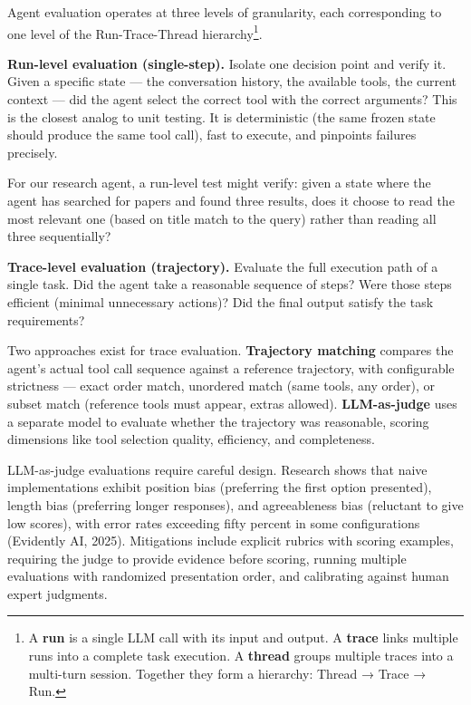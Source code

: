 \documentclass[11pt, a4paper]{article}
\begin{document}
Agent evaluation operates at three levels of granularity, each
corresponding to one level of the Run-Trace-Thread hierarchy\footnote{A
  \textbf{run} is a single LLM call with its input and output. A
  \textbf{trace} links multiple runs into a complete task execution. A
  \textbf{thread} groups multiple traces into a multi-turn session.
  Together they form a hierarchy: Thread → Trace → Run.}.

\textbf{Run-level evaluation (single-step).} Isolate one decision point
and verify it. Given a specific state --- the conversation history, the
available tools, the current context --- did the agent select the
correct tool with the correct arguments? This is the closest analog to
unit testing. It is deterministic (the same frozen state should produce
the same tool call), fast to execute, and pinpoints failures precisely.

For our research agent, a run-level test might verify: given a state
where the agent has searched for papers and found three results, does it
choose to read the most relevant one (based on title match to the query)
rather than reading all three sequentially?

\textbf{Trace-level evaluation (trajectory).} Evaluate the full
execution path of a single task. Did the agent take a reasonable
sequence of steps? Were those steps efficient (minimal unnecessary
actions)? Did the final output satisfy the task requirements?

Two approaches exist for trace evaluation. \textbf{Trajectory matching}
compares the agent's actual tool call sequence against a reference
trajectory, with configurable strictness --- exact order match,
unordered match (same tools, any order), or subset match (reference
tools must appear, extras allowed). \textbf{LLM-as-judge} uses a
separate model to evaluate whether the trajectory was reasonable,
scoring dimensions like tool selection quality, efficiency, and
completeness.

LLM-as-judge evaluations require careful design. Research shows that
naive implementations exhibit position bias (preferring the first option
presented), length bias (preferring longer responses), and agreeableness
bias (reluctant to give low scores), with error rates exceeding fifty
percent in some configurations (Evidently AI, 2025). Mitigations include
explicit rubrics with scoring examples, requiring the judge to provide
evidence before scoring, running multiple evaluations with randomized
presentation order, and calibrating against human expert judgments.
\end{document}
